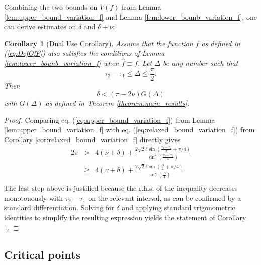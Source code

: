 \documentclass{article}
\newtheorem{corollary}[definition]{Corollary}
\begin{document}
Combining the two bounds on $V(f)$ from Lemma \ref{lem:upper_bound_variation_f} and Lemma \ref{lem:lower_bounb_variation_f}, one can derive estimates on $\delta$ and $\delta + \nu$:

\begin{corollary}[Dual Use Corollary] \label{cor:dual_use}
    Assume that the function $f$ as defined in (\ref{eq:DefOfF}) also satisfies the conditions of Lemma \ref{lem:lower_bounb_variation_f} when $\hat f \equiv f$. Let $\Delta$ be any number such that
    \[\tau_2 - \tau_1 \le \Delta \le \frac\pi2.\]
    Then
    \begin{equation} \label{eq:bound_delta_nu}
        \delta < (\pi -2\nu)G(\Delta)
    \end{equation}
    with $G(\Delta)$ as defined in Theorem \ref{theorem:main_results}.
\end{corollary}
\begin{proof}
    Comparing eq. (\ref{eq:upper_bound_variation_f}) from Lemma \ref{lem:upper_bound_variation_f} with eq. (\ref{eq:relaxed_bound_variation_f}) from Corollary \ref{cor:relaxed_bound_variation_f} directly gives
    \begin{eqnarray*}
        2\pi &>& 4(\nu + \delta) +\frac{ 2\sqrt 2\delta \sin(\frac{\tau_2 - \tau_1}{2} + \pi/4)}{\sin^2(\frac{\tau_2 - \tau_1}{4})}\\
        &\ge& 4(\nu + \delta) +\frac{ 2\sqrt 2\delta\sin(\frac\Delta 2 + \pi/4)}{\sin^2(\frac{\Delta}{4})}\\
    \end{eqnarray*}
    The last step above is justified because the r.h.s. of the inequality decreases monotonously with $\tau_2-\tau_1$ on the relevant interval, as can be confirmed by a standard differentiation.
    Solving for $\delta$ and applying standard trigonometric identities to simplify the resulting expression yields the statement of Corollary \ref{cor:dual_use}.
\end{proof}

\subsection{Critical points} \label{subsec:critical_points}
\end{document}
